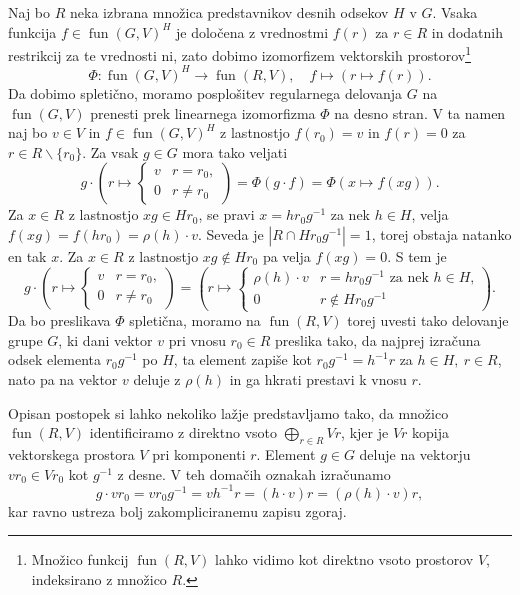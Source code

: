 \documentclass[11pt]{book}
\DeclareMathOperator\fun{fun}
\theoremstyle{definition}
\theoremstyle{zgled}
\theoremstyle{zgledbrezstevilke}
\theoremstyle{odprtproblem}
\theoremstyle{domacanaloga}
\theoremstyle{izrek}
\begin{document}
Naj bo $R$ neka izbrana množica predstavnikov desnih odsekov $H$ v $G$. Vsaka funkcija $f \in \fun(G,V)^H$ je določena z vrednostmi $f(r)$ za $r \in R$ in dodatnih restrikcij za te vrednosti ni, zato dobimo izomorfizem vektorskih prostorov\footnote{Množico funkcij $\fun(R,V)$ lahko vidimo kot direktno vsoto prostorov $V$, indeksirano z množico $R$.}
    \[
        \Phi \colon \fun(G,V)^H \to \fun(R,V), \quad
        f \mapsto \left( r \mapsto f(r) \right).
    \]
Da dobimo spletično, moramo posplošitev regularnega delovanja $G$ na $\fun(G,V)$ prenesti prek linearnega izomorfizma $\Phi$ na desno stran. V ta namen naj bo $v \in V$ in $f \in \fun(G,V)^H$ z lastnostjo $f(r_0) = v$ in $f(r) = 0$ za $r \in R \backslash \{ r_0 \}$. Za vsak $g \in G$ mora tako veljati
    \[
        g \cdot \left( r \mapsto \begin{cases} v & r = r_0, \\ 0 & r \neq r_0 \end{cases} \right) =
        \Phi \left( g \cdot f \right) =
        \Phi \left( x \mapsto f(xg) \right).
    \]
Za $x \in R$ z lastnostjo $xg \in Hr_0$, se pravi $x = h r_0 g^{-1}$ za nek $h \in H$, velja $f(xg) = f(hr_0) = \rho(h) \cdot v$. Seveda je $|R \cap H r_0 g^{-1}| = 1$, torej obstaja natanko en tak $x$. Za $x \in R$ z lastnostjo $xg \notin Hr_0$ pa velja $f(xg) = 0$. S tem je
    \[
        g \cdot \left( r \mapsto \begin{cases} v & r = r_0, \\ 0 & r \neq r_0 \end{cases} \right) =
        \left( r \mapsto \begin{cases} \rho(h) \cdot v & r = h r_0 g^{-1} \text{ za nek $h \in H$,} \\ 0 & r \notin H r_0 g^{-1} \end{cases} \right).
    \]
Da bo preslikava $\Phi$ spletična, moramo na $\fun(R,V)$ torej uvesti tako delovanje grupe $G$, ki dani vektor $v$ pri vnosu $r_0 \in R$ preslika tako, da najprej izračuna odsek elementa $r_0 g^{-1}$ po $H$, ta element zapiše kot $r_0 g^{-1} = h^{-1} r$ za $h \in H, \ r \in R$, nato pa na vektor $v$ deluje z $\rho(h)$ in ga hkrati prestavi k vnosu $r$.
    
Opisan postopek si lahko nekoliko lažje predstavljamo tako, da množico $\fun(R,V)$ identificiramo z direktno vsoto $\bigoplus_{r \in R} V r$, kjer je $Vr$ kopija vektorskega prostora $V$ pri komponenti $r$. Element $g \in G$ deluje na vektorju $v r_0 \in Vr_0$ kot $g^{-1}$ z desne. V teh domačih oznakah izračunamo
    \[
        g \cdot v r_0 = v r_0 g^{-1} = v h^{-1} r = (h \cdot v) r = (\rho(h) \cdot v) r,
    \]
kar ravno ustreza bolj zakompliciranemu zapisu zgoraj.
\end{document}
